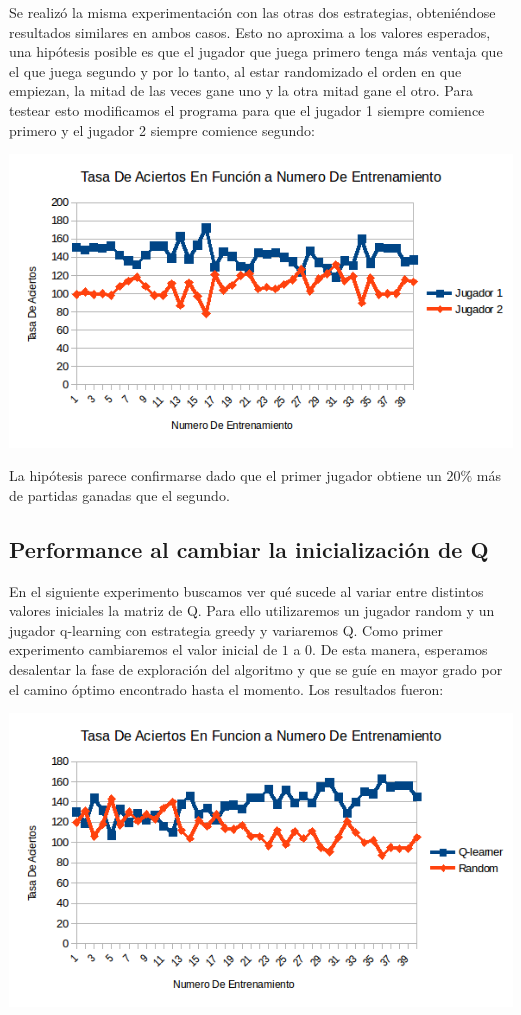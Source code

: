 Se realizó la misma experimentación con las otras dos estrategias, obteniéndose resultados similares en ambos casos. Esto no aproxima a los valores esperados, una hipótesis posible es que el jugador que juega primero tenga más ventaja que el que juega segundo y por lo tanto, al estar randomizado el orden en que empiezan, la mitad de las veces gane uno y la otra mitad gane el otro. Para testear esto modificamos el programa para que el jugador 1 siempre comience primero y el jugador 2 siempre comience segundo:

\includegraphics[scale=0.5]{testing/qvsq2.png}

La hipótesis parece confirmarse dado que el primer jugador obtiene un $20 \%$ más de partidas ganadas que el segundo.

\subsection{Performance al cambiar la inicialización de Q}

En el siguiente experimento buscamos ver qué sucede al variar entre distintos valores iniciales la matriz de Q. Para ello utilizaremos un jugador random y un jugador q-learning con estrategia greedy y variaremos Q. Como primer experimento cambiaremos el valor inicial de $1$ a $0$. De esta manera, esperamos desalentar la fase de exploración del algoritmo y que se guíe en mayor grado por el camino óptimo encontrado hasta el momento. Los resultados fueron:

\includegraphics[scale=0.5]{testing/variarq.png}

